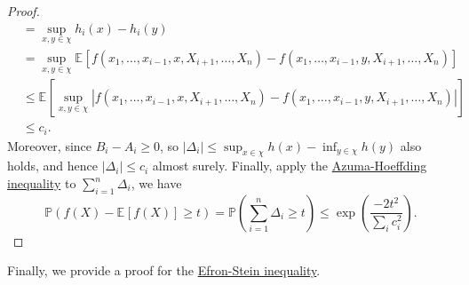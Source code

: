 \begin{proof}
\begin{align*}
		 & = \sup _{x, y\in \chi } h_i(x) - h_i(y)                                                                                                                                            \\
		 & = \sup _{x, y\in \chi } \mathbb{E}_{}\left[f(x_1, \dots , x_{i-1}, x, X_{i+1}, \dots , X_n ) - f(x_1, \dots , x_{i-1}, y, X_{i+1}, \dots , X_n)\right]                             \\
		 & \leq \mathbb{E}_{}\left[\sup _{x, y\in \chi } \left\vert f(x_1, \dots , x_{i-1}, x, X_{i+1}, \dots , X_n ) - f(x_1, \dots , x_{i-1}, y, X_{i+1}, \dots , X_n) \right\vert  \right] \\
		 & \leq c_i.
	\end{align*}
	Moreover, since \(B_i - A_i \geq 0\), so \(\vert \Delta _i \vert \leq \sup _{x\in \chi } h(x) - \inf _{y\in \chi } h(y)\) also holds, and hence \(\vert \Delta _i \vert \leq c_i\) almost surely. Finally, apply the \hyperref[thm:Azuma-Hoeffding-inequality]{Azuma-Hoeffding inequality} to \(\sum_{i=1}^{n} \Delta _i\), we have
	\[
		\mathbb{P} (f(X) - \mathbb{E}_{}\left[f(X) \right] \geq t )
		= \mathbb{P} \left( \sum_{i=1}^{n} \Delta _i \geq t \right)
		\leq \exp \left( \frac{-2t^2}{\sum_{i} c_i^2} \right).
	\]
\end{proof}

Finally, we provide a proof for the \hyperref[thm:Efron-Stein-inequality]{Efron-Stein inequality}.

